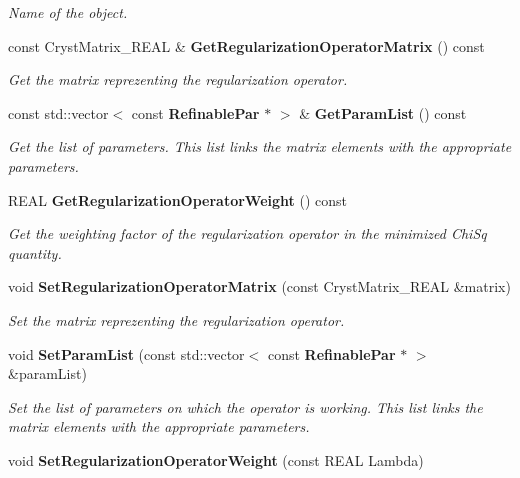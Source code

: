 \begin{DoxyCompactItemize}
\begin{DoxyCompactList}\small\item\em \-Name of the object. \end{DoxyCompactList}\item 
const \-Cryst\-Matrix\-\_\-\-R\-E\-A\-L \& {\bf \-Get\-Regularization\-Operator\-Matrix} () const 
\begin{DoxyCompactList}\small\item\em \-Get the matrix reprezenting the regularization operator. \end{DoxyCompactList}\item 
const std\-::vector$<$ const \*
{\bf \-Refinable\-Par} $\ast$ $>$ \& {\bf \-Get\-Param\-List} () const \label{a00040_ab03f9a1f27efa7c7d0d1bf67621611ec}

\begin{DoxyCompactList}\small\item\em \-Get the list of parameters. \-This list links the matrix elements with the appropriate parameters. \end{DoxyCompactList}\item 
\-R\-E\-A\-L {\bf \-Get\-Regularization\-Operator\-Weight} () const \label{a00040_ad4e1749323861d214ebd51a3f0771698}

\begin{DoxyCompactList}\small\item\em \-Get the weighting factor of the regularization operator in the minimized \-Chi\-Sq quantity. \end{DoxyCompactList}\item 
void {\bf \-Set\-Regularization\-Operator\-Matrix} (const \-Cryst\-Matrix\-\_\-\-R\-E\-A\-L \&matrix)
\begin{DoxyCompactList}\small\item\em \-Set the matrix reprezenting the regularization operator. \end{DoxyCompactList}\item 
void {\bf \-Set\-Param\-List} (const std\-::vector$<$ const {\bf \-Refinable\-Par} $\ast$ $>$ \&param\-List)\label{a00040_ad50b39cbdbe2a65dc3eb27e6fbe91852}

\begin{DoxyCompactList}\small\item\em \-Set the list of parameters on which the operator is working. \-This list links the matrix elements with the appropriate parameters. \end{DoxyCompactList}\item 
void {\bf \-Set\-Regularization\-Operator\-Weight} (const \-R\-E\-A\-L \-Lambda)\label{a00040_a2db1acb17c357632879a913845320d4b}


\end{DoxyCompactItemize}
